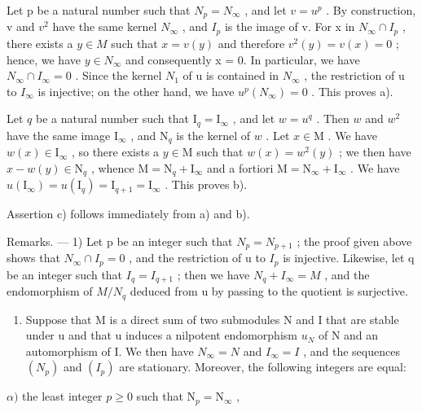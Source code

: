 Let p be a natural number such that \(N_{p} = N_{\infty}\) , and let \(v = u^{p}\) . By construction, v and \(v^{2}\) have the same kernel \(N_{\infty}\) , and \(I_{p}\) is the image of v. For x in \(N_{\infty} \cap I_{p}\) , there exists a \(y \in M\) such that \(x = v(y)\) and therefore \(v^{2}(y) = v(x) = 0\) ; hence, we have \(y \in N_{\infty}\) and consequently x = 0. In particular, we have \(N_{\infty} \cap I_{\infty} = 0\) . Since the kernel \(N_{1}\) of u is contained in \(N_{\infty}\) , the restriction of u to \(I_{\infty}\) is injective; on the other hand, we have \(u^{p}(N_{\infty}) = 0\) . This proves a).

Let \(q\) be a natural number such that \(\mathrm{I}_q = \mathrm{I}_{\infty}\) , and let \(w = u^q\) . Then \(w\) and \(w^2\) have the same image \(\mathrm{I}_{\infty}\) , and \(\mathrm{N}_q\) is the kernel of \(w\) . Let \(x \in \mathrm{M}\) . We have \(w(x) \in \mathrm{I}_{\infty}\) , so there exists a \(y \in \mathrm{M}\) such that \(w(x) = w^2(y)\) ; we then have \(x - w(y) \in \mathrm{N}_q\) , whence \(\mathrm{M} = \mathrm{N}_q + \mathrm{I}_{\infty}\) and a fortiori \(\mathrm{M} = \mathrm{N}_{\infty} + \mathrm{I}_{\infty}\) . We have \(u(\mathrm{I}_{\infty}) = u(\mathrm{I}_q) = \mathrm{I}_{q+1} = \mathrm{I}_{\infty}\) . This proves b).

Assertion c) follows immediately from a) and b).

Remarks. --- 1) Let p be an integer such that \(N_{p} = N_{p+1}\) ; the proof given above shows that \(N_{\infty} \cap I_{p} = 0\) , and the restriction of u to \(I_{p}\) is injective. Likewise, let q be an integer such that \(I_{q} = I_{q+1}\) ; then we have \(N_{q} + I_{\infty} = M\) , and the endomorphism of \(M/N_{q}\) deduced from u by passing to the quotient is surjective.

\begin{enumerate}
\def\labelenumi{\arabic{enumi})}
\setcounter{enumi}{1}
\tightlist
\item
  Suppose that M is a direct sum of two submodules N and I that are stable under u and that u induces a nilpotent endomorphism \(u_{N}\) of N and an automorphism of I. We then have \(N_{\infty} = N\) and \(I_{\infty} = I\) , and the sequences \((N_{p})\) and \((I_{p})\) are stationary. Moreover, the following integers are equal:
\end{enumerate}

\(\alpha)\) the least integer \(p \geqslant 0\) such that \(\mathrm{N}_p = \mathrm{N}_{\infty}\) ,

